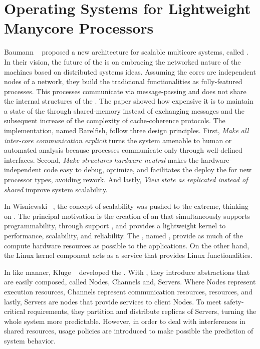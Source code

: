 \section{Operating Systems for Lightweight Manycore Processors}
\label{sec.works.os}

	Baumann \etal~\cite{Baumann2009} proposed a new \os architecture for scalable multicore
	systems, called \multikernel.
	In their vision, the future of the \oses is on embracing the networked nature
	of the machines based on distributed systems ideas.
	Assuming the cores are independent nodes of a network, they build the tradicional
	\os functionalities as fully-featured processes.
	This processes communicate via message-passing and does not share the internal
	structures of the \os.
	The paper showed how expensive it is to maintain a state of the \os through
	shared-memory instead of exchanging messages and the subsequent increase of
	the complexity of cache-coherence protocols.
	The \multikernel implementation, named Barelfish, follow three design principles.
	First, \textit{Make all inter-core communication explicit} turns the system
	amenable to human or automated analysis because processes communicate only
	through well-defined interfaces.
	Second, \textit{Make \os structures hardware-neutral} makes the hardware-independent
	code easy to debug, optimize, and facilitates the deploy the \os for new
	processor types, avoiding rework.
	And lastly, \textit{View \os state as replicated instead of shared} improve system
	scalability.

	In Wisniewski~\cite{Wisniewski2014} \etal, the concept of scalability was pushed
	to the extreme, thinking on \hpc.
	The principal motivation is the creation of an \os that simultaneously supports
	programmability, through support \linux \api, and provides a lightweight kernel
	to performance, scalability, and reliability.
	The \os, named \mos, provide as much of the compute hardware resources as
	possible to the \hpc applications. On the other hand, the Linux kernel
	component acts as a service that provides Linux functionalities.
	
	In like manner, Kluge \etal~\cite{kluge2014} developed the \moosca.
	With \moosca, they introduce abstractions that are easily composed, called Nodes,
	Channels and, Servers.
	Where Nodes represent execution resources, Channels represent communication
	resources, \eg \noc resources, and lastly, Servers are nodes that provide
	services to client Nodes.
	To meet safety-critical requirements, they partition \manycore and distribute
	replicas of Servers, turning the whole system more predictable.
	However, in order to deal with interferences in shared resources,
	usage policies are introduced to make possible the prediction of system behavior.

